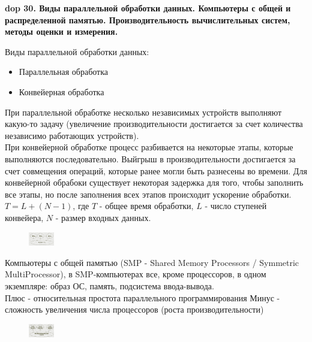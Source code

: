 \textbf{\LARGE dop 30. Виды параллельной обработки данных. Компьютеры с общей и распределенной памятью. Производительность вычислительных систем, методы оценки и измерения.}

Виды параллельной обработки данных:
\begin{itemize}
    \item Параллельная обработка
    \item Конвейерная обработка
\end{itemize}

При параллельной обработке несколько независимых устройств выполняют какую-то задачу (увеличение производительности достигается за счет количества независимо работающих устройств).\\
При конвейерной обработке процесс разбивается на некоторые этапы, которые выполняются последовательно. Выйгрыш в производительности достигается за счет совмещения операций, которые ранее могли быть разнесены во времени. Для конвейерной обрабоки существует некоторая задержка для того, чтобы заполнить все этапы, но после заполнения всех этапов происходит ускорение обработки. $T = L + (N - 1)$, где $T$ - общее время обработки, $L$ - число ступеней конвейера, $N$ - размер входных данных.\\

\begin{figure}
    \centering
    \includegraphics[width=0.1\textwidth]{pics/smp-computer.png}
\end{figure}

Компьютеры с общей памятью (SMP - Shared Memory Processors / Symmetric MultiProcessor), в SMP-компьютерах все, кроме процессоров, в одном экземпляре: образ ОС, память, подсистема ввода-вывода.\\
Плюс - относительная простота параллельного программирования
Минус - сложность увеличения числа процессоров (роста производительности)\\


\begin{figure}
    \centering
    \includegraphics[width=0.1\textwidth]{pics/distributed-memory-computer.png}
\end{figure}

